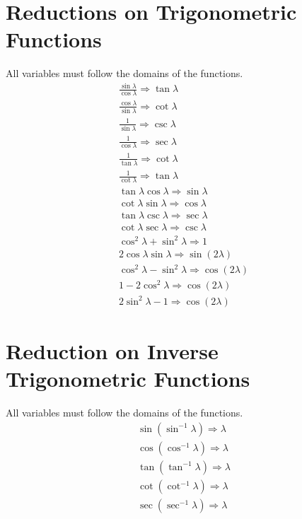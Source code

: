 \documentclass[11pt,a4paper]{book}
\begin{document}
\section{Reductions on Trigonometric Functions}
All variables must follow the domains of the functions.
\begin{eqnarray}
\frac{\sin\lambda}{\cos \lambda} \Rightarrow \tan \lambda \\
\frac{\cos \lambda}{\sin \lambda} \Rightarrow \cot \lambda \\
\frac{1}{\sin \lambda} \Rightarrow \csc\lambda \\
\frac{1}{\cos \lambda} \Rightarrow \sec\lambda \\
\frac{1}{\tan\lambda} \Rightarrow \cot \lambda \\
\frac{1}{\cot \lambda} \Rightarrow \tan \lambda \\
\tan \lambda \cos\lambda \Rightarrow \sin \lambda \\
\cot \lambda \sin \lambda \Rightarrow \cos \lambda \\
\tan \lambda \csc \lambda \Rightarrow \sec \lambda \\
\cot \lambda \sec \lambda \Rightarrow \csc \lambda \\
\cos^2 \lambda + \sin^2 \lambda \Rightarrow 1 \\
2 \cos \lambda \sin \lambda \Rightarrow \sin \left(2 \lambda\right) \\
\cos^2 \lambda - \sin^2 \lambda \Rightarrow \cos \left(2 \lambda \right) \\
1 - 2\cos^2\lambda \Rightarrow \cos \left(2 \lambda \right) \\
2\sin^2\lambda - 1 \Rightarrow \cos \left(2 \lambda \right)
\end{eqnarray}

\section{Reduction on Inverse Trigonometric Functions}
All variables must follow the domains of the functions.
\begin{eqnarray}
\sin(\sin^{-1}\lambda) \Rightarrow \lambda \\
\cos(\cos^{-1}\lambda) \Rightarrow \lambda \\
\tan(\tan^{-1}\lambda) \Rightarrow \lambda \\
\cot(\cot^{-1}\lambda) \Rightarrow \lambda \\
\sec(\sec^{-1}\lambda) \Rightarrow \lambda \\
\end{eqnarray}
\end{document}
